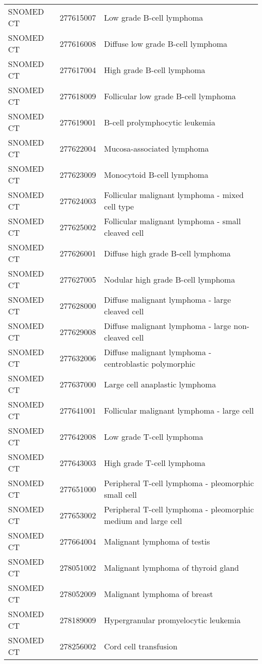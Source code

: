 \begin{longtable}{p{}p{}p{}}
  SNOMED CT & 277615007 & Low grade B-cell lymphoma \\ 
  SNOMED CT & 277616008 & Diffuse low grade B-cell lymphoma \\ 
  SNOMED CT & 277617004 & High grade B-cell lymphoma \\ 
  SNOMED CT & 277618009 & Follicular low grade B-cell lymphoma \\ 
  SNOMED CT & 277619001 & B-cell prolymphocytic leukemia \\ 
  SNOMED CT & 277622004 & Mucosa-associated lymphoma \\ 
  SNOMED CT & 277623009 & Monocytoid B-cell lymphoma \\ 
  SNOMED CT & 277624003 & Follicular malignant lymphoma - mixed cell type \\ 
  SNOMED CT & 277625002 & Follicular malignant lymphoma - small cleaved cell \\ 
  SNOMED CT & 277626001 & Diffuse high grade B-cell lymphoma \\ 
  SNOMED CT & 277627005 & Nodular high grade B-cell lymphoma \\ 
  SNOMED CT & 277628000 & Diffuse malignant lymphoma - large cleaved cell \\ 
  SNOMED CT & 277629008 & Diffuse malignant lymphoma - large non-cleaved cell \\ 
  SNOMED CT & 277632006 & Diffuse malignant lymphoma - centroblastic polymorphic \\ 
  SNOMED CT & 277637000 & Large cell anaplastic lymphoma \\ 
  SNOMED CT & 277641001 & Follicular malignant lymphoma - large cell \\ 
  SNOMED CT & 277642008 & Low grade T-cell lymphoma \\ 
  SNOMED CT & 277643003 & High grade T-cell lymphoma \\ 
  SNOMED CT & 277651000 & Peripheral T-cell lymphoma - pleomorphic small cell \\ 
  SNOMED CT & 277653002 & Peripheral T-cell lymphoma - pleomorphic medium and large cell \\ 
  SNOMED CT & 277664004 & Malignant lymphoma of testis \\ 
  SNOMED CT & 278051002 & Malignant lymphoma of thyroid gland \\ 
  SNOMED CT & 278052009 & Malignant lymphoma of breast \\ 
  SNOMED CT & 278189009 & Hypergranular promyelocytic leukemia \\ 
  SNOMED CT & 278256002 & Cord cell transfusion \\ 

\end{longtable}
